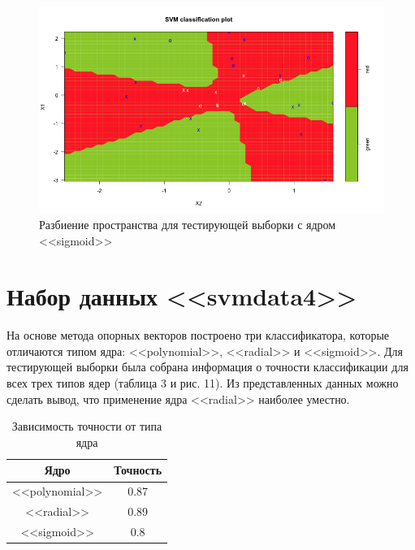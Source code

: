 \documentclass[]{article}
\numberwithin{equation}{section}
\begin{document}
        \begin{figure}[H]
            \centering
            \includegraphics[width = 0.9\linewidth]{data/data3_sigmoid.png}
            \caption{Разбиение пространства для тестирующей выборки с ядром <<sigmoid>>}
        \end{figure}

    \section{Набор данных <<svmdata4>>}
        На основе метода опорных векторов построено три классификатора, которые отличаются типом ядра: <<polynomial>>, <<radial>> и <<sigmoid>>. Для тестирующей выборки была собрана информация о точности классификации для всех трех типов ядер (таблица 3 и рис. 11). Из представленных данных можно сделать вывод, что применение ядра <<radial>> наиболее уместно.

        \begin{table}[H]
            \centering
            \begin{tabular}{|c|c|}
                \hline
                \textbf{Ядро}  & \textbf{Точность} \\
                \hline
                <<polynomial>> & 0.87 \\
                \hline
                <<radial>> & 0.89 \\
                \hline
                <<sigmoid>> & 0.8 \\
                \hline
            \end{tabular}
            \caption{Зависимость точности от типа ядра}
        \end{table}
\end{document}
